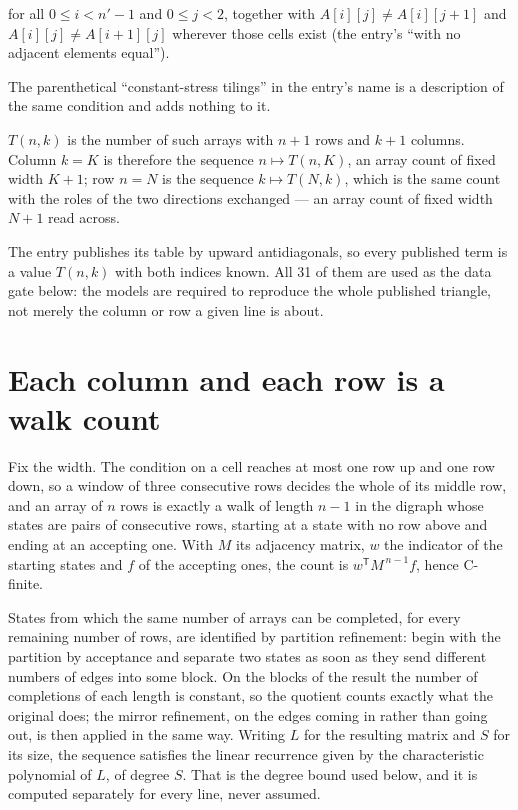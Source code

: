 \documentclass[11pt]{article}
\theoremstyle{definition}
\begin{document}
for all $0 \le i < n'-1$ and $0 \le j < 2$, together with $A[i][j] \ne A[i][j{+}1]$ and $A[i][j] \ne A[i{+}1][j]$ wherever those cells exist (the entry's ``with no adjacent elements equal'').

The parenthetical ``constant-stress tilings'' in the entry's name is a description of the same condition and adds nothing to it.

$T(n,k)$ is the number of such arrays with $n + 1$ rows and $k + 1$ columns. Column $k = K$ is therefore the sequence $n \mapsto T(n,K)$, an array count of fixed width $K + 1$; row $n = N$ is the sequence $k \mapsto T(N,k)$, which is the same count with the roles of the two directions exchanged --- an array count of fixed width $N + 1$ read across.

The entry publishes its table by upward antidiagonals, so every published term is a value $T(n,k)$ with both indices known. All 31 of them are used as the data gate below: the models are required to reproduce the whole published triangle, not merely the column or row a given line is about.

\section{Each column and each row is a walk count}

Fix the width. The condition on a cell reaches at most one row up and one row down, so a window of three consecutive rows decides the whole of its middle row, and an array of $n$ rows is exactly a walk of length $n-1$ in the digraph whose states are pairs of consecutive rows, starting at a state with no row above and ending at an accepting one. With $M$ its adjacency matrix, $w$ the indicator of the starting states and $f$ of the accepting ones, the count is $w^{\mathsf T}M^{\,n-1}f$, hence C-finite.

States from which the same number of arrays can be completed, for every remaining number of rows, are identified by partition refinement: begin with the partition by acceptance and separate two states as soon as they send different numbers of edges into some block. On the blocks of the result the number of completions of each length is constant, so the quotient counts exactly what the original does; the mirror refinement, on the edges coming in rather than going out, is then applied in the same way. Writing $L$ for the resulting matrix and $S$ for its size, the sequence satisfies the linear recurrence given by the characteristic polynomial of $L$, of degree $S$. That is the degree bound used below, and it is computed separately for every line, never assumed.
\end{document}
